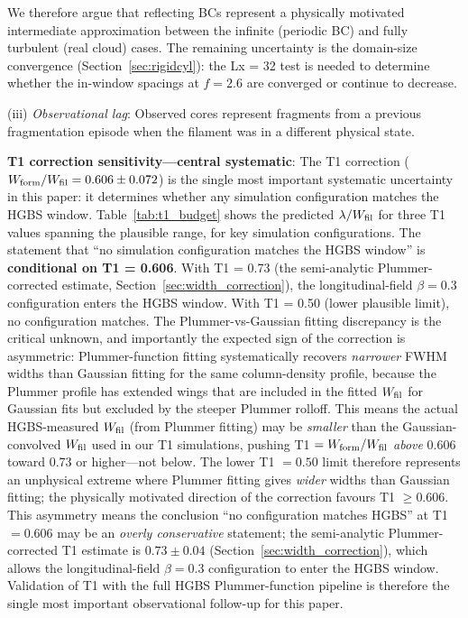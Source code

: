 \documentclass[twoside,twocolumn]{mnras}
\begin{document}
We therefore argue that reflecting BCs represent a physically motivated intermediate
approximation between the infinite (periodic BC) and fully turbulent (real cloud) cases.
The remaining uncertainty is the domain-size convergence (Section~\ref{sec:rigidcyl}):
the Lx = 32 test is needed to determine whether the in-window spacings at $f = 2.6$
are converged or continue to decrease.

(iii) \textit{Observational lag}: Observed cores represent fragments from a previous
fragmentation episode when the filament was in a different physical state.

\textbf{T1 correction sensitivity---central systematic}: The T1 correction
($W_{\rm form}/W_{\rm fil} = 0.606 \pm 0.072$) is the single most important systematic
uncertainty in this paper: it determines whether any simulation configuration matches
the HGBS window. Table~\ref{tab:t1_budget} shows the predicted $\lambda/W_{\rm fil}$
for three T1 values spanning the plausible range, for key simulation configurations.
The statement that ``no simulation configuration matches the HGBS window'' is
\textbf{conditional on T1 = 0.606}. With T1 = 0.73 (the semi-analytic Plummer-corrected estimate, Section~\ref{sec:width_correction}), the longitudinal-field $\beta = 0.3$ configuration enters the HGBS window.
With T1 = 0.50 (lower plausible limit), no configuration matches. The Plummer-vs-Gaussian fitting discrepancy is the critical unknown, and importantly the expected sign of the correction is asymmetric: Plummer-function fitting systematically recovers \textit{narrower} FWHM widths than Gaussian fitting for the same column-density profile, because the Plummer profile has extended wings that are included in the fitted $W_{\rm fil}$ for Gaussian fits but excluded by the steeper Plummer rolloff. This means the actual HGBS-measured $W_{\rm fil}$ (from Plummer fitting) may be \textit{smaller} than the Gaussian-convolved $W_{\rm fil}$ used in our T1 simulations, pushing T1 $= W_{\rm form}/W_{\rm fil}$ \textit{above} 0.606 toward 0.73 or higher---not below. The lower T1 $= 0.50$ limit therefore represents an unphysical extreme where Plummer fitting gives \textit{wider} widths than Gaussian fitting; the physically motivated direction of the correction favours T1 $\geq 0.606$. This asymmetry means the conclusion ``no configuration matches HGBS'' at T1 $= 0.606$ may be an \textit{overly conservative} statement; the semi-analytic Plummer-corrected T1 estimate is $0.73 \pm 0.04$ (Section~\ref{sec:width_correction}), which allows the longitudinal-field $\beta = 0.3$ configuration to enter the HGBS window. Validation of T1 with the full HGBS Plummer-function pipeline is therefore the single most important observational follow-up for this paper.
\end{document}
